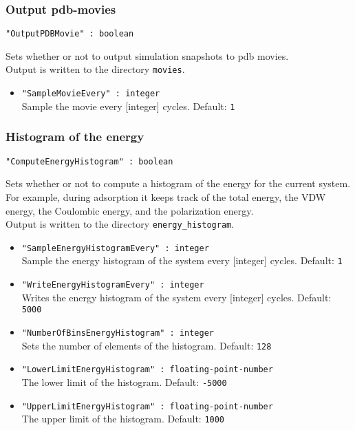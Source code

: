 \subsubsection{Output pdb-movies}
\begin{framed}
\verb+"OutputPDBMovie" : boolean+
\end{framed}
Sets whether or not to output simulation snapshots to pdb movies.\\
Output is written to the directory \verb+movies+.
\begin{itemize}
\item{\verb+"SampleMovieEvery" : integer+}\\
Sample the movie every [integer] cycles. Default: \verb+1+
\end{itemize}

\subsubsection{Histogram of the energy}
\begin{framed}
\verb+"ComputeEnergyHistogram" : boolean+
\end{framed}
Sets whether or not to compute a histogram of the energy for the current system.
For example, during adsorption it keeps track of the total energy, the VDW energy,
the Coulombic energy, and the polarization energy.\\
Output is written to  the directory \verb+energy_histogram+.
\begin{itemize}
\item{\verb+"SampleEnergyHistogramEvery" : integer+}\\
Sample the energy histogram of the system every [integer] cycles. Default: \verb+1+
\item{\verb+"WriteEnergyHistogramEvery" : integer+}\\
Writes the energy histogram of the system every [integer] cycles. Default: \verb+5000+
\item{\verb+"NumberOfBinsEnergyHistogram" : integer+}\\
Sets the number of elements of the histogram. Default: \verb+128+
\item{\verb+"LowerLimitEnergyHistogram" : floating-point-number+}\\
The lower limit of the histogram. Default: \verb+-5000+
\item{\verb+"UpperLimitEnergyHistogram" : floating-point-number+}\\
The upper limit of the histogram. Default: \verb+1000+
\end{itemize}


